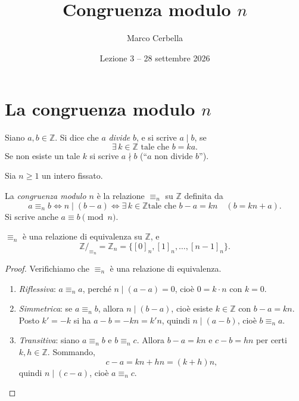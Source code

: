 \documentclass[11pt,a4paper]{article}
\title{Congruenza modulo $n$}
\author{Marco Cerbella}
\date{Lezione 3 -- 28 settembre 2026}
\begin{document}
\maketitle

\section{La congruenza modulo $n$}

\begin{definizione}
Siano $a, b \in \mathbb{Z}$. Si dice che $a$ \emph{divide} $b$, e si scrive
$a \mid b$, se
\[
\exists\, k \in \mathbb{Z} \text{ tale che } b = ka.
\]
Se non esiste un tale $k$ si scrive $a \nmid b$ (``$a$ non divide $b$'').
\end{definizione}

Sia $n \geq 1$ un intero fissato.

\begin{definizione}
La \emph{congruenza modulo $n$} è la relazione $\equiv_n$ su $\mathbb{Z}$
definita da
\[
a \equiv_n b \iff n \mid (b - a) \iff \exists\, k \in \mathbb{Z} \text{
tale che } b - a = kn \quad (b = kn + a).
\]
Si scrive anche $a \equiv b \pmod n$.
\end{definizione}

\begin{proposizione}
$\equiv_n$ è una relazione di equivalenza su $\mathbb{Z}$, e
\[
\mathbb{Z}/_{\equiv_n} = \mathbb{Z}_n = \{[0]_n, [1]_n, \dots, [n-1]_n\}.
\]
\end{proposizione}

\begin{proof}
Verifichiamo che $\equiv_n$ è una relazione di equivalenza.
\begin{enumerate}
    \item \emph{Riflessiva}: $a \equiv_n a$, perché $n \mid (a - a) = 0$,
          cioè $0 = k \cdot n$ con $k = 0$.
    \item \emph{Simmetrica}: se $a \equiv_n b$, allora $n \mid (b - a)$,
          cioè esiste $k \in \mathbb{Z}$ con $b - a = kn$. Posto
          $k' = -k$ si ha $a - b = -kn = k'n$, quindi $n \mid (a - b)$,
          cioè $b \equiv_n a$.
    \item \emph{Transitiva}: siano $a \equiv_n b$ e $b \equiv_n c$.
          Allora $b - a = kn$ e $c - b = hn$ per certi $k, h \in
          \mathbb{Z}$. Sommando,
          \[
          c - a = kn + hn = (k + h)n,
          \]
          quindi $n \mid (c - a)$, cioè $a \equiv_n c$. \qedhere
\end{enumerate}
\end{proof}
\end{document}
